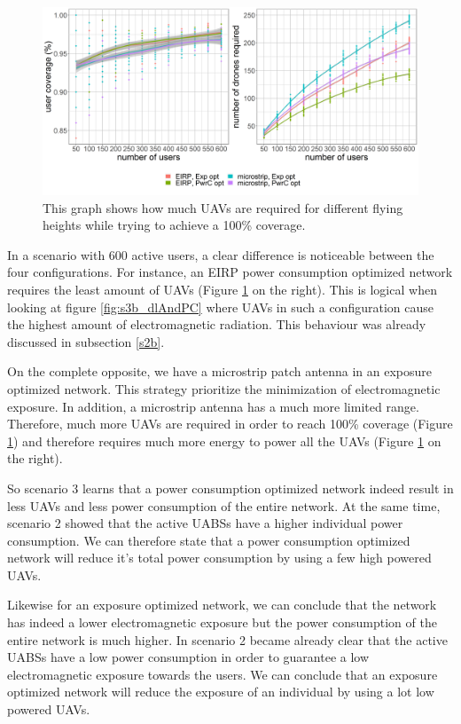 \begin{figure}[h!]
  \includegraphics[width=\textwidth]{../results/s3/uvsnumdronesAndCov.png}
  \caption{This graph shows how much \gls{UAV}s are required for different flying heights while trying to achieve a 100\% coverage.}
  \label{fig:s3b_numdronesAndCov}
\end{figure}

In a scenario with 600 active users, a clear difference is noticeable between the four configurations. 
For instance, an EIRP power consumption optimized 
network requires the least amount of \gls{UAV}s (Figure \ref{fig:s3b_numdronesAndCov} on the right). This is logical when looking at figure \ref{fig:s3b_dlAndPC} where \gls{UAV}s in such a configuration cause the highest amount of 
electromagnetic radiation. This behaviour was already discussed in subsection \ref{s2b}. 

On the complete opposite, we have a microstrip patch antenna in an exposure optimized network. 
This strategy prioritize the minimization of electromagnetic exposure. In addition, a microstrip antenna has a much more limited range.
Therefore, much more 
\gls{UAV}s are required in order to reach 100\% coverage (Figure \ref{fig:s3b_numdronesAndCov}) and therefore requires much more energy 
to power all the \gls{UAV}s (Figure \ref{fig:s3b_numdronesAndCov} on the right).

So scenario 3 learns that a power consumption optimized network indeed result in less \gls{UAV}s and less 
 power consumption of the entire network. 
At the same time, scenario 2 showed that the active \gls{UABS}s have a higher individual power consumption.
We can therefore state that a power consumption optimized network will reduce it's total power consumption by
using a few high powered \gls{UAV}s.

Likewise for an exposure optimized network, we can conclude that the network has indeed a lower electromagnetic exposure but the power consumption 
of the entire network is much higher. In scenario 2 became already clear that the active \gls{UABS}s have a low power consumption in order to 
guarantee a low electromagnetic exposure towards the users.
We can conclude that an exposure optimized network will reduce the exposure of an individual by 
using a lot low powered \gls{UAV}s.

